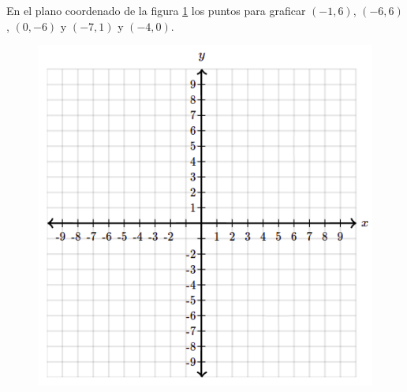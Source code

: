 En el plano coordenado de la figura \ref{fig:plane} los puntos para graficar $(-1,6)$, $(-6,6)$, $(0,-6)$ y $(-7,1)$ y $(-4,0)$.
\begin{figure}[H]
    \begin{center}
        \includegraphics[width=1\textwidth]{../images/plane}
    \end{center}
    \caption{}
    \label{fig:plane}
\end{figure}